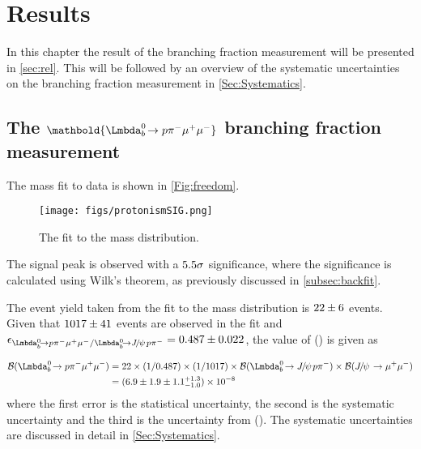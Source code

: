 \chapter{Results}
\label{Sec:Results}

In this chapter the result of the \Lbpi branching fraction measurement will be presented in \autoref{sec:rel}. This will be followed by an overview of the systematic uncertainties on the \Lbpi branching fraction measurement in \autoref{Sec:Systematics}. %

\section[The $\Lbpi$ branching fraction measurement]{The $\mathbold{\Lbpi}$ branching fraction measurement}
\label{sec:rel}

The mass fit to \Lbpi data is shown in \autoref{Fig:freedom}.
\begin{figure}[h!]
  \def\nh{0.7\textwidth}
  \centering
  \hspace*{-1.0cm}
  \texttt{[image: figs/protonismSIG.png]}%
  \caption{The fit to the \Lbpi mass distribution.}%
  \label{Fig:freedom}
\end{figure}

The \Lbpi signal peak is observed with a $5.5\sigma$ significance, where the significance  is calculated using Wilk's theorem, as previously discussed in \autoref{subsec:backfit}.

The \Lbpi event yield taken from the fit to the \Lbpi mass distribution is $22\pm6$ events. Given that $1017\pm41$ events are observed in the \Lbpijpsi fit and $\epsilon_{\Lbpi/\Lbpijpsi} = \tw$, the value of \BF(\Lbpi) is given as

\begin{equation}
  \begin{split}
    \BF(\Lbpi) & = 22 \times (1/0.487) \times (1/1017) \times \BF(\Lbpijpsi)\times\BF(\jpsi\to\mumu) \\
    & = \BFV\\
  \end{split}\end{equation}
where the first error is the statistical uncertainty, the second is the systematic uncertainty and the third is the uncertainty from \BF(\Lbpijpsi). The systematic uncertainties are discussed in detail in \autoref{Sec:Systematics}.

